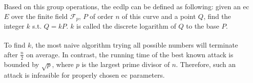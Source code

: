 Based on this group operations, the \gls{ecdlp} \cite{ecdlp} can be defined as following: given an \gls{ec} $E$ over the finite field $\mathcal{F}_p$, $P$ of order $n$ of this curve 
and a point $Q$, find the integer $k$ s.t. $Q = kP$. $k$ is called the discrete logarithm of $Q$ to the base $P$.
\\
\\
To find $k$, the most naive algorithm trying all possible numbers will terminate after $\frac{n}{2}$ on average. In contrast, the running time of the best known attack is bounded by 
$\sqrt{p}$, where $p$ is the largest prime divisor of $n$. Therefore, such an attack is infeasible for properly chosen \gls{ec} parameters.
